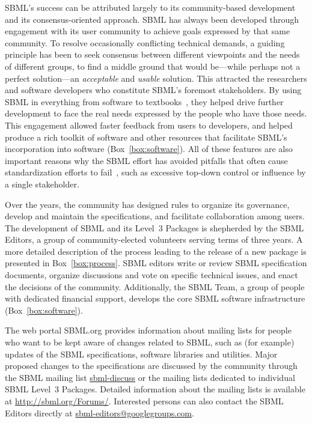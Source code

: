 \documentclass[]{draft-sbml-paper}
\begin{document}
SBML's success can be attributed largely to its community-based development and its consensus-oriented approach. SBML has always been developed through engagement with its user community to achieve goals expressed by that same community. To resolve occasionally conflicting technical demands, a guiding principle has been to seek consensus between different viewpoints and the needs of different groups, to find a middle ground that would be---while perhaps not a perfect solution---an \emph{acceptable} and \emph{usable} solution. This attracted the researchers and software developers who constitute SBML's foremost stakeholders. By using SBML in everything from software to textbooks~\citep{Cesario2011cancer, Sullivan2012introduction, Wilkinson2018stochastic, Klipp2016systems, Choi2010systems, Jack2009discrete, Govindjee2009photosynthesis, Liu2009systems, Choi2008introduction, Sauro2014systems, DiStefano2015dynamic}, they helped drive further development to face the real needs expressed by the people who have those needs.  This engagement allowed faster feedback from users to developers, and helped produce a rich toolkit of software and other resources that facilitate SBML's incorporation into software (Box~\ref{box:software}).  All of these features are also important reasons why the SBML effort has avoided pitfalls that often cause standardization efforts to fail~\citep{Cargill2011why}, such as excessive top-down control or influence by a single stakeholder.

Over the years, the community has designed rules to organize its governance, develop and maintain the specifications, and facilitate collaboration among users.  The development of SBML and its Level~3 Packages is shepherded by the SBML Editors, a group of community-elected volunteers serving terms of three years. A more detailed description of the process leading to the release of a new package is presented in Box~\ref{box:process}. SBML editors write or review SBML specification documents, organize discussions and vote on specific technical issues, and enact the decisions of the community. Additionally, the SBML Team, a group of people with dedicated financial support, develops the core SBML software infrastructure (Box~\ref{box:software}).

The web portal SBML.org provides information about mailing lists for people who want to be kept aware of changes related to SBML, such as (for example) updates of the SBML specifications, software libraries and utilities.  Major proposed changes to the specifications are discussed by the community through the SBML mailing list \url{sbml-discuss} or the mailing lists dedicated to individual SBML Level~3 Packages.  Detailed information about the mailing lists is available at \url{http://sbml.org/Forums/}. Interested persons can also contact the SBML Editors directly at \url{sbml-editors@googlegroups.com}.
\end{document}

